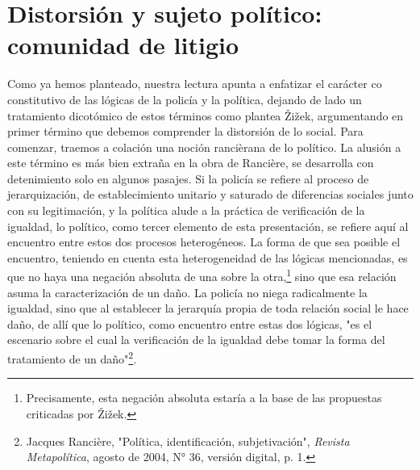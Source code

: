 \documentclass{book}
\begin{document}
\section{Distorsión y sujeto político: comunidad de litigio}

Como ya hemos planteado, nuestra lectura apunta a enfatizar el carácter
co constitutivo de las lógicas de la policía y la política, dejando de
lado un tratamiento dicotómico de estos términos como plantea Žižek,
argumentando en primer término que debemos comprender la distorsión de
lo social. Para comenzar, traemos a colación una noción rancièrana de lo
político. La alusión a este término es más bien extraña en la obra de
Rancière, se desarrolla con detenimiento solo en algunos pasajes. Si la
policía se refiere al proceso de jerarquización, de establecimiento
unitario y saturado de diferencias sociales junto con su legitimación, y
la política alude a la práctica de verificación de la igualdad, lo
político, como tercer elemento de esta presentación, se refiere aquí al
encuentro entre estos dos procesos heterogéneos. La forma de que sea
posible el encuentro, teniendo en cuenta esta heterogeneidad de las
lógicas mencionadas, es que no haya una negación absoluta de una sobre
la otra,\footnote{Precisamente, esta negación absoluta estaría a la base
  de las propuestas criticadas por Žižek.} sino que esa relación asuma
la caracterización de un daño. La policía no niega radicalmente la
igualdad, sino que al establecer la jerarquía propia de toda relación
social le hace daño, de allí que lo político, como encuentro entre estas
dos lógicas, "es el escenario sobre el cual la verificación de la
igualdad debe tomar la forma del tratamiento de un daño"\footnote{Jacques
  Rancière, "Política, identificación, subjetivación", \emph{Revista
  Metapolítica}, agosto de 2004, N° 36, versión digital, p. 1.}.
\end{document}
